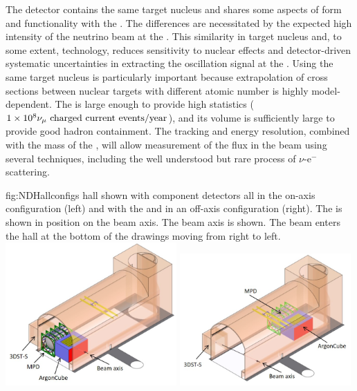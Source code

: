 The  detector contains the same target nucleus and shares some aspects of form and functionality with the . The differences are necessitated by the expected high intensity of the neutrino beam at the .  This similarity in target nucleus and, to some extent, technology, reduces sensitivity to nuclear effects and detector-driven systematic uncertainties in extracting the oscillation signal at the  . Using the same target nucleus is particularly important because extrapolation of cross sections between nuclear targets with different atomic number is highly model-dependent. The  is large enough to provide high statistics ($\num{1e8}{\numu \text{ charged current events/year}}$), and its volume is sufficiently large to provide good hadron containment.  The tracking and energy resolution, combined with the mass of the , will allow measurement of the flux in the beam using several techniques, including the well understood but rare process of $\nu$-e$^{-}$ scattering.

\begin{dunefigure}
{fig:NDHallconfigs}
{  hall shown with component detectors all in the on-axis configuration (left) and with the  and  in an off-axis configuration (right). The  is shown in position on the beam axis. The beam axis is shown.  The beam enters the hall at the bottom of the drawings moving from right to left.}
\includegraphics[width=0.49\textwidth]{graphics/NDHall_onaxis.jpg}
\includegraphics[width=0.49\textwidth]{graphics/NDHall_offaxis.jpg}
\end{dunefigure}

